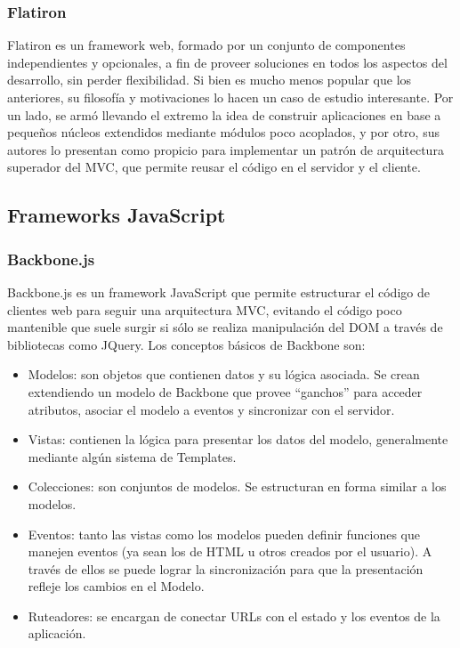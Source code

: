 \documentclass[doc,helv,longtable]{article}
\begin{document}
\subsubsection{Flatiron}
Flatiron\cite{flatiron} es un framework web, formado por un conjunto de componentes independientes y opcionales, a fin de proveer soluciones en todos los aspectos del desarrollo, sin perder flexibilidad\cite{flatironintro}. Si bien es mucho menos popular que los anteriores, su filosofía y motivaciones lo hacen un caso de estudio interesante. Por un lado, se armó llevando el extremo la idea de construir aplicaciones en base a pequeños núcleos extendidos mediante módulos poco acoplados\cite{nodephilosophy}, y por otro, sus autores lo presentan como propicio para implementar un patrón de arquitectura superador del MVC, que permite reusar el código en el servidor y el cliente\cite{isomorphic}. 

\subsection{Frameworks JavaScript}
\subsubsection{Backbone.js}
Backbone.js\cite{backbone} es un framework JavaScript que permite estructurar el código de clientes web para seguir una arquitectura MVC, evitando el código poco mantenible que suele surgir si sólo se realiza manipulación del DOM a través de bibliotecas como JQuery. Los conceptos básicos de Backbone son\cite{backboneaddy}:
\begin{itemize}
\item  Modelos: son objetos que contienen datos y su lógica asociada. Se crean extendiendo un modelo de Backbone que provee “ganchos” para acceder atributos, asociar el modelo a eventos y sincronizar con el servidor.
\item  Vistas: contienen la lógica para presentar los datos del modelo, generalmente mediante algún sistema de Templates.
\item  Colecciones: son conjuntos de modelos. Se estructuran en forma similar a los modelos.
\item  Eventos: tanto las vistas como los modelos pueden definir funciones que manejen eventos (ya sean los de HTML u otros creados por el usuario). A través de ellos se puede lograr la sincronización para que la presentación refleje los cambios en el Modelo.
\item  Ruteadores: se encargan de conectar URLs con el estado y los eventos de la aplicación.

\end{itemize}
\end{document}
